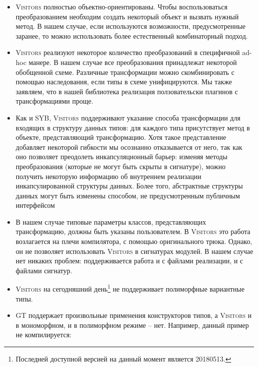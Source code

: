 \begin{itemize}
   \item \textsc{Visitors} полностью объектно-ориентированы. Чтобы воспользоваться преобразованием необходим создать некоторый объект и вызвать нужный метод. В нашем случае, если используются возможности, предусмотренные заранее, то можно использовать более естественный комбинаторный подход.
     
   \item \textsc{Visitors} реализуют некоторое количество преобразований в специфичной ad-hoc манере. В нашем случае все преобразования принадлежат некоторой обобщенной схеме. Различные трансформации можно скомбинировать с помощью наследования, если типы в схеме унифицируются. Мы также заявляем, что в нашей библиотека реализация ползовательски плагинов с трансформациями проще. 
     
   \item Как и  SYB, \textsc{Visitors} поддерживают указание способа трансформации для входящих в структуру данных типов: для каждого типа присутствует метод в объекте, представляющий трансформацию. Хотя такое представление добавляет некоторой гибкости мы осознанно отказывается от него, так как оно позволяет преодолеть инкапсуляционный барьер: изменяя методы преобразования (которые не могут быть скрыты в сигнатуре), можно получить некоторую информацию об внутреннем реализации инкапсулированной структуры данных. Более того, абстрактные структуры данных могут быть изменены способом, не предусмотренным публичным интерфейсом

   \item В нашем случае типовые параметры классов, представляющих трансформацию, должны быть указаны пользователем. В \textsc{Visitors} это работа возлагается на плечи компилятора, с помощью оригинального трюка. Однако, он не позволяет использовать \textsc{Visitors} в сигнатурах модулей. В нашем случае нет никаких проблем: поддерживается работа и с файлами реализации, и с файлами сигнатур.

   \item \textsc{Visitors} на сегодняшний день\footnote{Последней доступной версией на данный момент является 20180513.} не поддерживает полиморфные вариантные типы.
   
   \item \textsc{GT} поддержает произвольные применения конструкторов типов, а  \textsc{Visitors} и в мономорфном, и в полиморфном режиме -- нет.
     Например, данный пример не компилируется:
     

\end{itemize}
